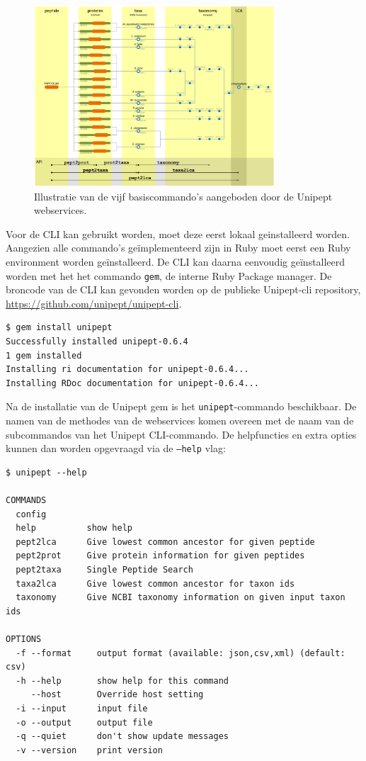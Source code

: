 \begin{figure}
	\centering
	\includegraphics[width=0.8\textwidth]{includes/apiworkflow}
	\caption{Illustratie van de vijf basiscommando's aangeboden door de Unipept 
	webservices.}
	\label{fig:apiworkflow}
\end{figure}

Voor de CLI kan gebruikt worden, moet deze eerst lokaal geinstalleerd worden. 
Aangezien alle commando's geïmplementeerd zijn in Ruby moet eerst een Ruby 
environment worden geïnstalleerd. De CLI kan daarna eenvoudig geïnstalleerd 
worden met het het commando \texttt{gem}, de interne Ruby Package manager. De 
broncode van de CLI kan gevonden worden op de publieke Unipept-cli repository, 
\url{https://github.com/unipept/unipept-cli}.

\begin{lstlisting}
$ gem install unipept
Successfully installed unipept-0.6.4
1 gem installed
Installing ri documentation for unipept-0.6.4...
Installing RDoc documentation for unipept-0.6.4...
\end{lstlisting}

Na de installatie van de Unipept gem is het \texttt{unipept}-commando 
beschikbaar. De namen van de methodes van de webservices komen 
overeen met de naam van de subcommandos van het Unipept CLI-commando. De 
helpfuncties en extra opties kunnen dan worden opgevraagd via 
de \texttt{--help} vlag:

\begin{lstlisting}
$ unipept --help

COMMANDS
  config
  help          show help
  pept2lca      Give lowest common ancestor for given peptide
  pept2prot     Give protein information for given peptides
  pept2taxa     Single Peptide Search
  taxa2lca      Give lowest common ancestor for taxon ids
  taxonomy      Give NCBI taxonomy information on given input taxon ids

OPTIONS
  -f --format     output format (available: json,csv,xml) (default: csv)
  -h --help       show help for this command      
     --host       Override host setting
  -i --input      input file
  -o --output     output file
  -q --quiet      don't show update messages
  -v --version    print version
\end{lstlisting}

